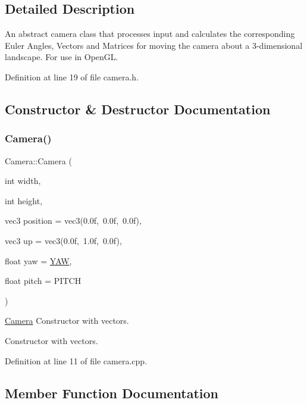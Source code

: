 \subsection{Detailed Description}
An abstract camera class that processes input and calculates the corresponding Euler Angles, Vectors and Matrices for moving the camera about a 3-\/dimensional landscape. For use in Open\+GL. 

Definition at line 19 of file camera.\+h.



\subsection{Constructor \& Destructor Documentation}
\mbox{\label{classCamera_ab7a973c909384f298849f8b8cc78f96a}} 
\subsubsection{\texorpdfstring{Camera()}{Camera()}}
{\footnotesize\ttfamily Camera\+::\+Camera (\begin{DoxyParamCaption}\item[{int}]{width,  }\item[{int}]{height,  }\item[{vec3}]{position = {\ttfamily vec3(0.0f,~0.0f,~0.0f)},  }\item[{vec3}]{up = {\ttfamily vec3(0.0f,~1.0f,~0.0f)},  }\item[{float}]{yaw = {\ttfamily \hyperlink{classCamera_a409bc996200b4781bb35cff69bc700ae}{Y\+AW}},  }\item[{float}]{pitch = {\ttfamily PITCH} }\end{DoxyParamCaption})}



\hyperlink{classCamera}{Camera} Constructor with vectors. 

Constructor with vectors. 

Definition at line 11 of file camera.\+cpp.



\subsection{Member Function Documentation}
\mbox{\label{classCamera_aebba33a8b281fe2598bcafc54a55d296}} 

